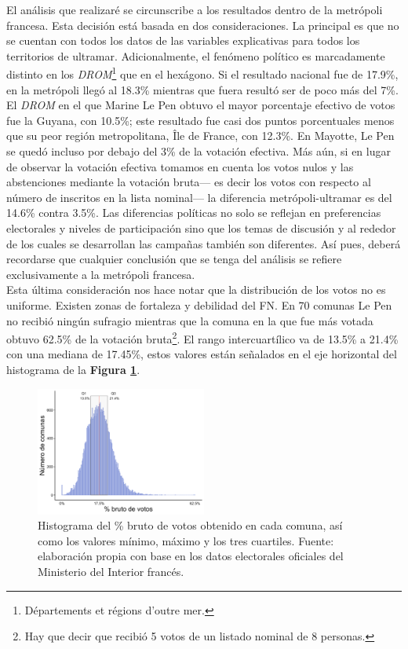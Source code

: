 El análisis que realizaré se circunscribe a los resultados dentro de la metrópoli francesa. Esta decisión está basada en dos consideraciones. La principal es que no se cuentan con todos los datos de las variables explicativas para todos los territorios de ultramar. Adicionalmente, el fenómeno político es marcadamente distinto en los \textit{DROM}\footnote{Départements et régions d'outre mer.} que en el hexágono. Si el resultado nacional fue de 17.9\%, en la metrópoli llegó al 18.3\% mientras que fuera resultó ser de poco más del 7\%. El \textit{DROM} en el que Marine Le Pen obtuvo el mayor porcentaje efectivo de votos fue la Guyana, con 10.5\%; este resultado fue casi dos puntos porcentuales menos que su peor región metropolitana, Île de France, con 12.3\%. En Mayotte, Le Pen se quedó incluso por debajo del 3\% de la votación efectiva. Más aún, si en lugar de observar la votación efectiva tomamos en cuenta los votos nulos y las abstenciones mediante la votación bruta--- es decir los votos con respecto al número de inscritos en la lista nominal--- la diferencia metrópoli-ultramar es del 14.6\% contra 3.5\%. Las diferencias políticas no solo se reflejan en preferencias electorales y niveles de participación sino que los temas de discusión y al rededor de los cuales se desarrollan las campañas también son diferentes. Así pues, deberá recordarse que cualquier conclusión que se tenga del análisis se refiere exclusivamente a la metrópoli francesa.\\

Esta última consideración nos hace notar que la distribución de los votos no es uniforme. Existen zonas de fortaleza y debilidad del FN. En 70 comunas Le Pen no recibió ningún sufragio mientras que la comuna en la que fue más votada obtuvo 62.5\% de la votación bruta\footnote{Hay que decir que recibió 5 votos de un listado nominal de 8 personas.}. El rango intercuartílico va de 13.5\% a 21.4\% con una mediana de 17.45\%, estos valores están señalados en el eje horizontal del histograma de la \textbf{Figura \ref{fig:Distr_Br}}.\\ 

\begin{figure}[h]
	\centering
	\includegraphics[width = 0.5\textwidth]{Figs/AED/Distr_Votos_Br_P12_FN}
	\caption{Histograma del \% bruto de votos obtenido en cada comuna, así como los valores mínimo, máximo y los tres cuartiles. Fuente: elaboración propia con base en los datos electorales oficiales del Ministerio del Interior francés.}
	\label{fig:Distr_Br}	
\end{figure}

